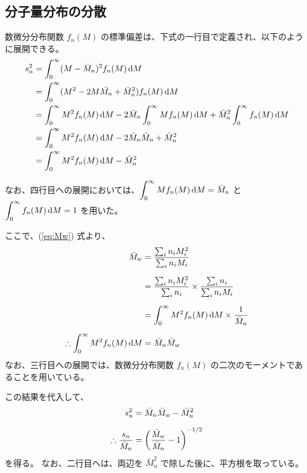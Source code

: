 \documentclass[a4paper,11pt]{jlreq}
\begin{document}
\subsection{分子量分布の分散}
数微分分布関数 $f_n(M)$ の標準偏差は、下式の一行目で定義され、以下のように展開できる。
\begin{align}
s_n^2
	&= \displaystyle \int_0^{\infty}(M - \bar{M}_n)^2 f_n(M) \odif{M} \notag \\
	&= \displaystyle \int_0^{\infty}(M^2 - 2M \bar{M_n} + \bar{M}_n^2) f_n(M) \odif{M} \notag \\
	&= \displaystyle \int_0^{\infty} M^2 f_n(M) \odif{M} - 2 \bar{M}_n \displaystyle \int_0^{\infty} M f_n(M) \odif{M} + \bar{M}_n^2 \displaystyle \int_0^{\infty} f_n(M) \odif{M} \notag \\
	&= \displaystyle \int_0^{\infty} M^2 f_n(M) \odif{M} - 2 \bar{M}_n \bar{M}_n + \bar{M}_n^2  \notag \\
	&= \displaystyle \int_0^{\infty} M^2 f_n(M) \odif{M} - \bar{M}_n^2
\end{align}

なお、四行目への展開においては、$\displaystyle \int_0^{\infty} M f_n(M) \odif{M} = \bar{M}_n$ と $\displaystyle \int_0^{\infty} f_n(M) \odif{M} = 1$ を用いた。

ここで、(\ref{eq:Mw}) 式より、
\begin{align}
{\bar M}_w 
	&= \dfrac{\sum_i n_i M_i^2}{\sum_i n_i M_i}\notag \\[6pt]
	&= \dfrac{\sum_i n_i M_i^2}{\sum_i n_i} \times \dfrac{\sum_i n_i}{\sum_i n_i M_i}\notag \\[6pt]
	&= \displaystyle \int_0^{\infty} M^2 f_n(M) \odif{M} \times \dfrac{1}{\bar{M}_n }\notag \\[6pt]
\therefore \displaystyle \int_0^{\infty} M^2 f_n(M) \odif{M} &= \bar{M}_n \bar{M}_w
\end{align}
なお、三行目への展開では、数微分分布関数 $f_n(M)$ の二次のモーメントであることを用いている。

この結果を代入して、
\begin{align}
s_n^2 &= \bar{M}_n \bar{M}_w - \bar{M}_n^2\notag \\[6pt]
\therefore \dfrac{s_n}{\bar{M}_n} &= \left(\dfrac{\bar{M}_w}{ \bar{M}_n} - 1 \right)^{-1/2}
\end{align}
を得る。
なお、二行目へは、両辺を $\bar{M}_n^2$ で除した後に、平方根を取っている。
\end{document}
